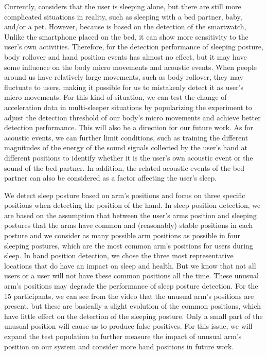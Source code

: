  Currently, {\systemname} considers that the user is sleeping alone, but there are still more
complicated situations in reality, such as sleeping with a bed partner, baby, and/or a pet. However, because {\systemname} is based on the
detection of the smartwatch, Unlike the smartphone placed on the bed, it can show more sensitivity to the user's own activities. Therefore,
for the detection performance of sleeping posture, body rollover and hand position events has almost no effect, but it may have some
influence on the body micro movements and acoustic events. When people around us have relatively large movements, such as body rollover,
they may fluctuate to users, making it possible for us to mistakenly detect it as user's micro movements. For this kind of situation, we
can test the change of acceleration data in multi-sleeper situations by popularizing the experiment to adjust the detection threshold of
our body's micro movements and achieve better detection performance. This will also be a direction for our future work. As for acoustic
events, we can further limit conditions, such as training the different magnitudes of the energy of the sound signals collected by the
user's hand at different positions to identify whether it is the user's own acoustic event or the sound of the bed partner. In addition,
the related acoustic events of the bed partner can also be considered as a factor affecting the user's sleep.

 We detect sleep posture based on arm's positions and focus on three specific positions
when detecting the position of the hand. In sleep position detection, we are based on the assumption that between the user's arms position
and sleeping postures that the arms have common and (reasonably) stable positions in each posture and we consider as many possible arm
positions as possible in four sleeping postures, which are the most common arm's positions for users during sleep. In hand position
detection, we chose the three most representative locations that do have an impact on sleep and health. But we know that not all users or a
user will not have these common positions all the time. These unusual arm's positions may degrade the performance of sleep posture
detection. For the 15 participants, we can see from the video that the unusual arm's positions are present, but these are basically a
slight evolution of the common positions, which have little effect on the detection of the sleeping posture. Only a small part of the
unusual position will cause us to produce false positives. For this issue, we will expand the test population to further measure the impact
of unusual arm's position on our system and consider more hand positions in future work.

